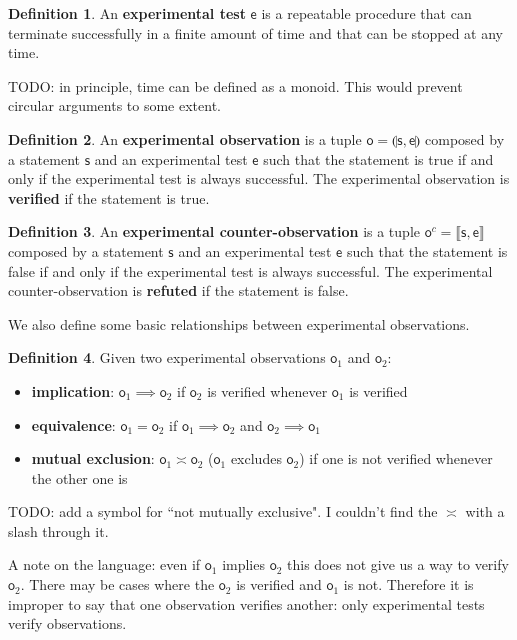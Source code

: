 \documentclass[review]{elsarticle}
\theoremstyle{plain}%
\theoremstyle{definition}
\newtheorem{defn}{Definition}[section]
\theoremstyle{remark}
\begin{document}
\begin{defn}
	An \textbf{experimental test} $\mathsf{e}$ is a repeatable procedure that can terminate successfully in a finite amount of time and that can be stopped at any time.
\end{defn}

TODO: in principle, time can be defined as a monoid. This would prevent circular arguments to some extent.

\begin{defn}
	An \textbf{experimental observation} is a tuple $\mathsf{o} = \llparenthesis \mathsf{s}, \mathsf{e} \rrparenthesis$ composed by a statement $\mathsf{s}$ and an experimental test $\mathsf{e}$ such that the statement is true if and only if the  experimental test is always successful. The experimental observation is \textbf{verified} if the statement is true.
\end{defn}

\begin{defn}
	An \textbf{experimental counter-observation} is a tuple $\mathsf{o}^c= \llbracket \mathsf{s}, \mathsf{e} \rrbracket$ composed by a statement $\mathsf{s}$ and an experimental test $\mathsf{e}$ such that the statement is false if and only if the experimental test is always successful. The experimental counter-observation is \textbf{refuted} if the statement is false.
\end{defn}

We also define some basic relationships between experimental observations.

\begin{defn}
	Given two experimental observations $\mathsf{o}_1$ and $\mathsf{o}_2$:
	\begin{itemize}
	\item \textbf{implication}: $\mathsf{o}_1 \implies \mathsf{o}_2$ if $\mathsf{o}_2$ is verified whenever $\mathsf{o}_1$ is verified
	\item \textbf{equivalence}: $\mathsf{o}_1 = \mathsf{o}_2$ if $\mathsf{o}_1 \implies \mathsf{o}_2$ and $\mathsf{o}_2 \implies \mathsf{o}_1$
	\item \textbf{mutual exclusion}: $\mathsf{o}_1 \asymp \mathsf{o}_2$ ($\mathsf{o}_1$ excludes $\mathsf{o}_2$) if one is not verified whenever the other one is
	\end{itemize}
\end{defn}
TODO: add a symbol for ``not mutually exclusive". I couldn't find the $\asymp$ with a slash through it. 


A note on the language: even if $\mathsf{o}_1$ implies $\mathsf{o}_2$ this does not give us a way to verify $\mathsf{o}_2$. There may be cases where the $\mathsf{o}_2$ is verified and $\mathsf{o}_1$ is not. Therefore it is improper to say that one observation verifies another: only experimental tests verify observations.
\end{document}
